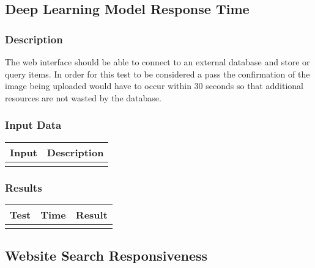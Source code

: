 \documentclass{scrreprt}
\begin{document}
 \vspace{1cm}

\subsection{Deep Learning Model Response Time}
\subsubsection{Description}
\begin{flushleft}
The web interface should be able to connect to an external database and store or query items. In order for this test to be considered a pass the confirmation of the image being uploaded would have to occur within 30 seconds so that additional resources are not wasted by the database.
\subsubsection{Input Data}
 \centering
 \begin{tabular}{p{3cm}p{6cm}}
 \hline\hline
 Input & Description\\
 \hline\hline
   &  \\ %
 \hline
 \end{tabular}
\subsubsection{Results}
\end{flushleft}
 \centering
 \begin{tabular}{||p{1.5cm}|p{1.5cm}|p{1.5cm}||}
 \hline
 \textbf Test & \textbf Time & \textbf Result \\
 \hline\hline
   &  & \\ %
 \hline
 \end{tabular}

  \vspace{1cm}

 \subsection{Website Search Responsiveness}
\end{document}
